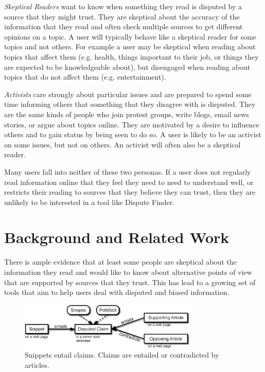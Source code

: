 \documentclass{www2010-accepted}
\begin{document}
{\it Skeptical Readers} want to know when something they read is disputed by a source that they might trust. They are skeptical about the accuracy of the information that they read and often check multiple sources to get different opinions on a topic. A user will typically behave like a skeptical reader for some topics and not others. For example a user may be skeptical when reading about topics that affect them (e.g. health, things important to their job, or things they are expected to be knowledgeable about), but disengaged when reading about topics that do not affect them (e.g. entertainment).

{\it Activists} care strongly about particular issues and are prepared to spend some time informing others that something that they disagree with is disputed. They are the same kinds of people who join protest groups, write blogs, email news stories, or argue about topics online. They are motivated by a desire to influence others and to gain status by being seen to do so. A user is likely to be an activist on some issues, but not on others. An activist will often also be a skeptical reader.

Many users fall into neither of these two personas. If a user does not regularly read information online that they feel they need to need to understand well, or restricts their reading to sources that they believe they can trust, then they are unlikely to be interested in a tool like Dispute Finder.


\section{Background and Related Work}

There is ample evidence that at least some people are skeptical about the information they read and would like to know about alternative points of view that are supported by sources that they trust. This has lead to a growing set of tools that aim to help users deal with disputed and biased information.


\begin{figure}[tb]
	\begin{center}
	\includegraphics[width=8.5cm]{pictures/snippet_claim_article_fancy3.png}
	\caption{Snippets entail claims. Claims are entailed or contradicted by articles.}
	\label{snippet_claim_article}
	\end{center}
\end{figure}
\end{document}
